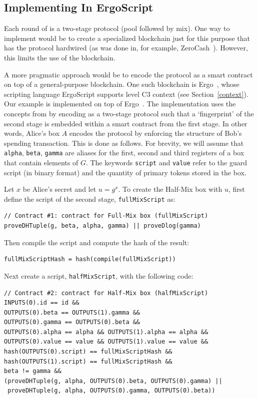 \documentclass[11pt]{article}
\newcommand{\langname}{ErgoScript\xspace}
\begin{document}
\subsection{Implementing \algname In \langname}
\label{impl}
Each round of \algname is a two-stage protocol (pool followed by mix). One way to implement \algname would be to create a specialized blockchain just for this purpose that has the protocol hardwired (as was done in, for example, ZeroCash~\cite{zcash}). However, this limits the use of the blockchain. 

A more pragmatic approach would be to encode the protocol as a smart contract on top of a general-purpose blockchain. 
One such blockchain is Ergo~\cite{ergo}, whose scripting language \langname supports level C3 context (see Section~\ref{context}). Our example is implemented on top of Ergo~\cite{ergomix-impl}. 
The implementation uses the concepts from \cite{multistage} by encoding \algname as a two-stage protocol such that a `fingerprint' of the second stage is embedded within a smart contract from the first stage. 
In other words, Alice's box $A$ encodes the protocol by enforcing the structure of Bob's spending transaction. 
This is done as follows. For brevity, we will assume that \texttt{alpha}, \texttt{beta}, \texttt{gamma} are aliases for the first, second and third registers of a box that contain elements of $G$. The keywords \texttt{script} and \texttt{value} refer to the guard script (in binary format) and the quantity of primary tokens stored in the box. 

Let $x$ be Alice's secret and let $u = g^x$. To create the Half-Mix box with $u$, first define the script of the second stage, \texttt{fullMixScript} as:
{\small
\begin{Verbatim}[frame=single]
// Contract #1: contract for Full-Mix box (fullMixScript)
proveDHTuple(g, beta, alpha, gamma) || proveDlog(gamma)
\end{Verbatim}
}
Then compile the script and compute the hash of the result:

{\small
\begin{verbatim}
fullMixScriptHash = hash(compile(fullMixScript))
\end{verbatim}
}
Next create a script, \texttt{halfMixScript}, with the following code:
{\small
\begin{Verbatim}[frame=single]
// Contract #2: contract for Half-Mix box (halfMixScript)
INPUTS(0).id == id &&
OUTPUTS(0).beta == OUTPUTS(1).gamma && 
OUTPUTS(0).gamma == OUTPUTS(0).beta && 
OUTPUTS(0).alpha == alpha && OUTPUTS(1).alpha == alpha &&
OUTPUTS(0).value == value && OUTPUTS(1).value == value &&
hash(OUTPUTS(0).script) == fullMixScriptHash &&  
hash(OUTPUTS(1).script) == fullMixScriptHash &&
beta != gamma && 
(proveDHTuple(g, alpha, OUTPUTS(0).beta, OUTPUTS(0).gamma) || 
 proveDHTuple(g, alpha, OUTPUTS(0).gamma, OUTPUTS(0).beta))
\end{Verbatim}
}
\end{document}
